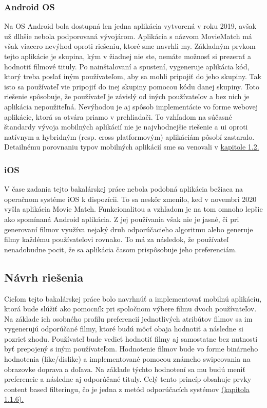 \subsubsection{Android OS}
Na OS Android bola dostupná len jedna aplikácia vytvorená v roku 2019, avšak už dlhšie nebola podporovaná vývojárom. Aplikácia s názvom MovieMatch má však viacero nevýhod oproti riešeniu, ktoré sme navrhli my. Základným prvkom tejto aplikácie je skupina, kým v žiadnej nie ste, nemáte možnosť si prezerať a hodnotiť filmové tituly. Po nainštalovaní a spustení, vygeneruje aplikácia kód, ktorý treba poslať iným používateľom, aby sa mohli pripojiť do jeho skupiny. Tak isto sa používateľ vie pripojiť do inej skupiny pomocou kódu danej skupiny. Toto riešenie spôsobuje, že používateľ je závislý od iných používateľov a bez nich je aplikácia nepoužiteľná. Nevýhodou je aj spôsob implementácie vo forme webovej aplikácie, ktorá sa otvára priamo v prehliadači. To vzhľadom na súčasné štandardy vývoja mobilných aplikácií nie je najvhodnejšie riešenie a \acrshort{ui} oproti natívnym a hybridným (resp. cross platformovým) aplikáciám pôsobí zastaralo. Detailnému porovnaniu typov mobilných aplikácií sme sa venovali v \hyperref[sec:typy aplikacii]{kapitole 1.2.}
\subsubsection{iOS}
V čase zadania tejto bakalárskej práce nebola podobná aplikácia bežiaca na operačnom systéme iOS k dispozícii. To sa neskôr zmenilo, keď v novembri 2020 vyšla aplikácia Movie Match. Funkcionalitou a vzhľadom je na tom omnoho lepšie ako spomínaná Android aplikácia. Z jej používania však nie je jasné, či pri generovaní filmov využíva nejaký druh odporúčacieho algoritmu alebo generuje filmy každému používateľovi rovnako. To má za následok, že  používateľ nenadobudne pocit, že sa aplikácia časom prispôsobuje jeho preferenciám. 


\subsection{Návrh riešenia}
Cieľom tejto bakalárskej práce bolo navrhnúť a implementovať mobilnú aplikáciu, ktorá bude slúžiť ako pomocník pri spoločnom výbere filmu dvoch používateľov. Na základe ich osobného profilu preferencií jednotlivých atribútov filmov sa im vygenerujú odporúčané filmy, ktoré budú môcť obaja hodnotiť a následne si pozrieť zhodu. Používateľ bude vedieť hodnotiť filmy aj samostatne bez nutnosti byť prepojený s iným používateľom. Hodnotenie filmov bude vo forme binárneho hodnotenia (like/dislike) a implementované pomocou známeho swipeovania na obrazovke doprava a doľava. Na základe týchto hodnotení sa mu budú meniť preferencie a následne aj odporúčané tituly. Celý tento princíp obsahuje prvky content based filteringu, čo je jedna z metód odporúčacích systémov \hyperref[sec:contentbased]{(kapitola 1.1.6).}

